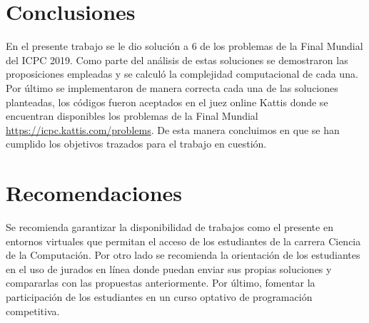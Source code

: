 \documentclass{report}
\begin{document}
\chapter*{Conclusiones}
\label{chap:Conclusiones}

En el presente trabajo se le dio soluci\'on a 6 de los problemas de la Final Mundial del ICPC 2019. Como parte del an\'alisis de estas soluciones se demostraron las proposiciones empleadas y se calcul\'o la complejidad computacional de cada una. Por \'ultimo se implementaron de manera correcta cada una de las soluciones planteadas, los c\'odigos fueron aceptados en el juez online Kattis donde se encuentran disponibles los problemas de la Final Mundial \hyperlink{Kattis}{https://icpc.kattis.com/problems}. De esta manera concluimos en que se han cumplido los objetivos trazados para el trabajo en cuesti\'on. \\

\chapter*{Recomendaciones}
\label{chap:Recomendaciones}

Se recomienda garantizar la disponibilidad de trabajos como el presente en entornos virtuales que permitan el acceso de los estudiantes de la carrera Ciencia de la Computaci\'on. Por otro lado se recomienda la orientaci\'on de los estudiantes en el uso de jurados en l\'inea donde puedan enviar sus propias soluciones y compararlas con las propuestas anteriormente. Por \'ultimo, fomentar la participaci\'on de los estudiantes en un curso optativo de programaci\'on competitiva. 


\renewcommand{\bibname}{Referencia Bibliogr\'afica}

\end{document}
